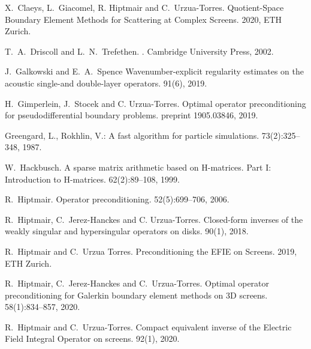 \documentclass[]{report}
\begin{document}
\begin{small}
\begin{thebibliography}{0}
		X.~Claeys, L.~Giacomel, R. Hiptmair and C.~Urzua-Torres.
		\newblock Quotient-Space Boundary Element Methods for Scattering at Complex Screens.
		 2020, ETH Zurich.
		
		T.~A.~Driscoll and L.~N.~Trefethen.
		.
		\newblock Cambridge University Press, 2002.
		
		J.~Galkowski and E.~A.~Spence
		\newblock Wavenumber-explicit regularity estimates on the acoustic single-and double-layer operators.
		 91(6), 2019.
		
		H.~Gimperlein, J.~Stocek and C. Urzua-Torres.
		\newblock Optimal operator preconditioning for pseudodifferential boundary problems.
		 preprint 1905.03846, 2019.
		
		Greengard, L., Rokhlin, V.:
		\newblock A fast algorithm for particle simulations.
		 73(2):325--348, 1987.
		
		W.~Hackbusch.
		\newblock A sparse matrix arithmetic based on H-matrices. Part I: Introduction to H-matrices.
		 62(2):89--108, 1999.
		
		R.~Hiptmair.
		\newblock Operator preconditioning.
		 52(5):699--706, 2006.
		
		
		R.~Hiptmair, C.~Jerez-Hanckes and C. Urzua-Torres.
		\newblock Closed-form inverses of the weakly singular and hypersingular operators on disks.
		 90(1), 2018.
		
		
		R.~Hiptmair and C.~Urzua Torres.
		Preconditioning the EFIE on Screens.
		 2019, ETH Zurich.
		
		
		R.~Hiptmair, C.~Jerez-Hanckes and C.~Urzua-Torres.
		\newblock Optimal operator preconditioning for Galerkin boundary element methods on 3D screens. 
		 58(1):834--857, 2020.
		
		R.~Hiptmair and C.~Urzua-Torres.
		\newblock Compact equivalent inverse of the {E}lectric {F}ield
		{I}ntegral {O}perator on screens.
		 92(1), 2020.


\end{thebibliography}
\end{small}
\end{document}
